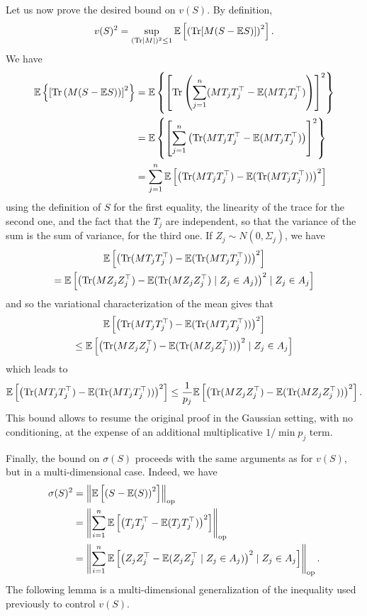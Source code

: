 \documentclass[]{article}
\newcommand{\E}{\mathbb{E}}
\newcommand{\Tr}{\text{\rm Tr}}
\newcommand{\op}{{\rm op}}
\theoremstyle{plain}
\theoremstyle{definition}
\begin{document}
Let us now prove the desired bound on $v(S)$. By definition,
\[ v(S)^2 = \sup_{(\Tr \lvert M \rvert)^2 \leq 1} \E \left[  \left( \Tr[M (S - \E S) ]\right)^2 \right]. \]
We have
\begin{align*}
	\E \left\{ \left[ \Tr \left( M (S - \E S) \right) \right]^2 \right\} &= \E \left\{ \left[ \Tr \left( \sum_{j=1}^n (M T_j T_j^\top - \E(M T_j T_j^\top) \right) \right]^2 \right\}\\
	&= \E \left\{ \left[ \sum_{j=1}^n \left( \Tr  (M T_j T_j^\top - \E(M T_j T_j^\top) \right) \right]^2 \right\}\\
	&= \sum_{j=1}^n \E \left[ \left( \Tr  (M T_j T_j^\top) - \E(\Tr(M T_j T_j^\top)) \right)^2 \right]
\end{align*}
using the definition of $S$ for the first equality, the linearity of the trace for the second one, and the fact that the $T_j$ are independent, so that the variance of the sum is the sum of variance, for the third one. If $Z_j \sim N(0, \Sigma_j)$, we have
\begin{multline*}
	\E \left[ \left( \Tr  (M T_j T_j^\top) - \E(\Tr(M T_j T_j^\top)) \right)^2 \right]\\
	= \E \left[ \left( \Tr  (M Z_j Z_j^\top) - \E(\Tr(M Z_j Z_j^\top) \mid Z_j \in A_j) \right)^2 \mid Z_j \in A_j \right]
\end{multline*}
and so the variational characterization of the mean gives that
\begin{multline*}
	\E \left[ \left( \Tr  (M T_j T_j^\top) - \E(\Tr(M T_j T_j^\top)) \right)^2 \right]\\
	\leq \E \left[ \left( \Tr  (M Z_j Z_j^\top) - \E(\Tr(M Z_j Z_j^\top)) \right)^2 \mid Z_j \in A_j \right]
\end{multline*}
which leads to
\[ \E \left[ \left( \Tr  (M T_j T_j^\top) - \E(\Tr(M T_j T_j^\top)) \right)^2 \right] \leq \frac{1}{p_j} \E \left[ \left( \Tr  (M Z_j Z_j^\top) - \E(\Tr(M Z_j Z_j^\top)) \right)^2 \right]. \]
This bound allows to resume the original proof in the Gaussian setting, with no conditioning, at the expense of an additional multiplicative $1/\min p_j$ term.

Finally, the bound on $\sigma(S)$ proceeds with the same arguments as for $v(S)$, but in a multi-dimensional case. Indeed, we have
\begin{align*}
	\sigma(S)^2 & = \left \lVert \E \left[ \left( S - \E(S) \right)^2 \right] \right \rVert_\op\\
	& = \left \lVert \sum_{i=1}^n \E \left[ \left( T_j T_j^\top - \E(T_j T_j^\top) \right)^2 \right] \right \rVert_\op\\
	& = \left \lVert \sum_{i=1}^n \E \left[ \left( Z_j Z_j^\top - \E(Z_j Z_j^\top \mid Z_j \in A_j) \right)^2 \mid Z_j \in A_j \right] \right \rVert_\op.
\end{align*}
The following lemma is a multi-dimensional generalization of the inequality used previously to control $v(S)$.
\end{document}
